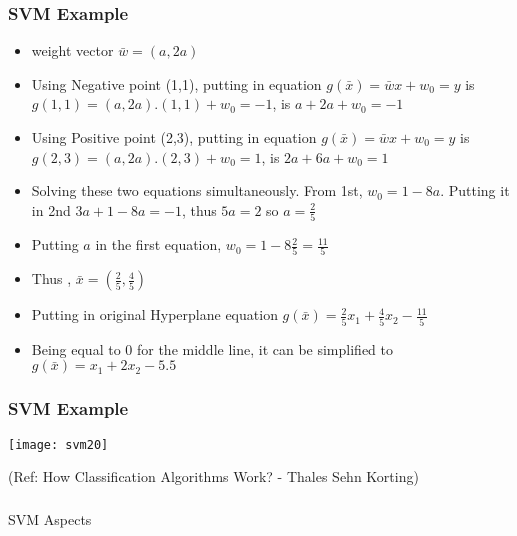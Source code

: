 \begin{frame}[fragile] \frametitle{SVM Example}
\begin{itemize}
\item weight vector $\bar{w} = (a,2a)$
\item Using Negative point (1,1), putting in equation $g(\bar{x}) = \bar{w}x + w_0 = y$ is $g(1,1) = (a,2a).(1,1) + w_0 = -1$, is $a + 2a + w_0 = -1$
\item Using Positive point (2,3), putting in equation $g(\bar{x}) = \bar{w}x + w_0 = y$ is $g(2,3) = (a,2a).(2,3) + w_0 = 1$, is $2a + 6a + w_0 = 1$
\item Solving these two equations simultaneously. From 1st, $w_0 = 1 - 8a$. Putting it in 2nd $3a + 1 - 8a = -1$, thus $5a = 2$ so $a = \frac{2}{5}$
\item Putting $a$ in the first equation, $ w_0 = 1 - 8\frac{2}{5} = \frac{11}{5}$
\item Thus , $ \bar{x} = (\frac{2}{5},\frac{4}{5})$
\item Putting in original Hyperplane equation $g(\bar{x}) = \frac{2}{5}x_1 + \frac{4}{5}x_2 - \frac{11}{5}$
\item Being equal to 0 for the middle line, it can be simplified to $g(\bar{x}) = x_1 + 2x_2 - 5.5$
\end{itemize}
\end{frame}


\begin{frame}[fragile] \frametitle{SVM Example}
\begin{center}
\texttt{[image: svm20]}

\tiny{(Ref: How Classification Algorithms Work? - Thales Sehn Korting)}
\end{center}
\end{frame}


\begin{frame}[fragile]\frametitle{}
\begin{center}
{\Large SVM Aspects}
\end{center}
\end{frame}




